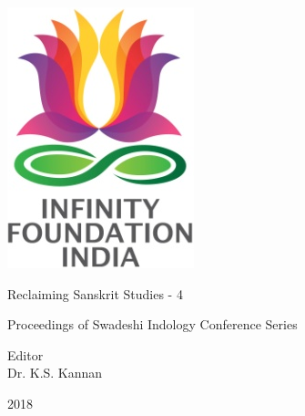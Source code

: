 \thispagestyle{empty}

\includegraphics{"images/logo.png"}

Reclaiming Sanskrit Studies - 4


Proceedings of Swadeshi Indology Conference Series

Editor\\Dr. K.S. Kannan


2018

